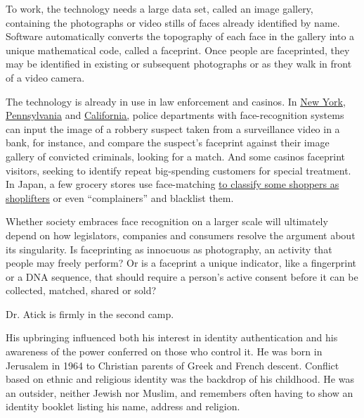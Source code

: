 To work, the technology needs a large data set, called an image gallery,
containing the photographs or video stills of faces already identified
by name. Software automatically converts the topography of each face in
the gallery into a unique mathematical code, called a faceprint. Once
people are faceprinted, they may be identified in existing or subsequent
photographs or as they walk in front of a video camera.

The technology is already in use in law enforcement and casinos. In
\href{http://nypost.com/2012/03/16/nypd-uses-high-tech-facial-recognition-software-to-nab-barbershop-shooting-suspect/}{New
York},
\href{http://www.govtech.com/public-safety/Pennsylvania-Facial-Recognition-Systems-Integrate-to-Widen-Search-for-Criminals.html}{Pennsylvania}
and
\href{http://www.nbcsandiego.com/news/local/Chula-Vista-Police-Dept-New-Facial-Recognition-Technology-231835401.html}{California,}
police departments with face-recognition systems can input the image of
a robbery suspect taken from a surveillance video in a bank, for
instance, and compare the suspect's faceprint against their image
gallery of convicted criminals, looking for a match. And some casinos
faceprint visitors, seeking to identify repeat big-spending customers
for special treatment. In Japan, a few grocery stores use face-matching
\href{http://www.scmp.com/news/asia/article/1466536/115-japanese-stores-sharing-customers-facial-data}{to
classify some shoppers as shoplifters} or even ``complainers'' and
blacklist them.

Whether society embraces face recognition on a larger scale will
ultimately depend on how legislators, companies and consumers resolve
the argument about its singularity. Is faceprinting as innocuous as
photography, an activity that people may freely perform? Or is a
faceprint a unique indicator, like a fingerprint or a DNA sequence, that
should require a person's active consent before it can be collected,
matched, shared or sold?

Dr. Atick is firmly in the second camp.

His upbringing influenced both his interest in identity authentication
and his awareness of the power conferred on those who control it. He was
born in Jerusalem in 1964 to Christian parents of Greek and French
descent. Conflict based on ethnic and religious identity was the
backdrop of his childhood. He was an outsider, neither Jewish nor
Muslim, and remembers often having to show an identity booklet listing
his name, address and religion.

